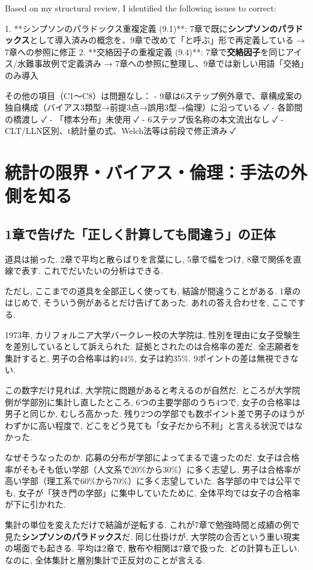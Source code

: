 ﻿Based on my structural review, I identified the following issues to correct:

1. **シンプソンのパラドックス重複定義 (9.1)**: 7章で既に\textbf{シンプソンのパラドックス}として導入済みの概念を、9章で改めて「と呼ぶ」形で再定義している → 7章への参照に修正
2. **交絡因子の重複定義 (9.4)**: 7章で\textbf{交絡因子}を同じアイス/水難事故例で定義済み → 7章への参照に整理し、9章では新しい用語「交絡」のみ導入

その他の項目（C1〜C8）は問題なし：
- 9章は6ステップ例外章で、章構成案の独自構成（バイアス3類型→前提3点→誤用3型→倫理）に沿っている ✓
- 各節間の橋渡し ✓
- 「標本分布」未使用 ✓
- 6ステップ仮名称の本文流出なし ✓
- CLT/LLN区別、t統計量の式、Welch法等は前段で修正済み ✓

\section{統計の限界・バイアス・倫理：手法の外側を知る}

\subsection{1章で告げた「正しく計算しても間違う」の正体}

道具は揃った.
2章で平均と散らばりを言葉にし, 5章で幅をつけ, 8章で関係を直線で表す. これでだいたいの分析はできる.

ただし, ここまでの道具を全部正しく使っても, 結論が間違うことがある.
1章のはじめで, そういう例があるとだけ告げてあった.
あれの答え合わせを, ここでする.

1973年, カリフォルニア大学バークレー校の大学院は, 性別を理由に女子受験生を差別しているとして訴えられた.
証拠とされたのは合格率の差だ.
全志願者を集計すると, 男子の合格率は約44\%, 女子は約35\%.
9ポイントの差は無視できない.

この数字だけ見れば, 大学院に問題があると考えるのが自然だ.
ところが大学院側が学部別に集計し直したところ, 6つの主要学部のうち4つで, 女子の合格率は男子と同じか, むしろ高かった.
残り2つの学部でも数ポイント差で男子のほうがわずかに高い程度で, どこをどう見ても「女子だから不利」と言える状況ではなかった.

なぜそうなったのか. 応募の分布が学部によってまるで違ったのだ.
女子は合格率がそもそも低い学部（人文系で20\%から30\%）に多く志望し, 男子は合格率が高い学部（理工系で60\%から70\%）に多く志望していた.
各学部の中では公平でも, 女子が「狭き門の学部」に集中していたために, 全体平均では女子の合格率が下に引かれた.

集計の単位を変えただけで結論が逆転する.
これが7章で勉強時間と成績の例で見た\textbf{シンプソンのパラドックス}だ. 同じ仕掛けが, 大学院の合否という重い現実の場面でも起きる.
平均は2章で, 散布や相関は7章で扱った. どの計算も正しい.
なのに, 全体集計と層別集計で正反対のことが言える.

